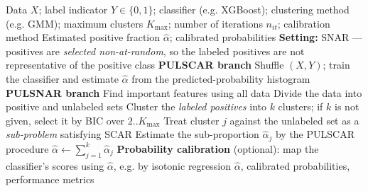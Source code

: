 \documentclass{article}
\begin{document}
\begin{algorithm}[!h]
\renewcommand{\algorithmicrequire}{\textbf{Input:}} %
\renewcommand{\algorithmicensure}{\textbf{Output:}} %
	\caption{PULSNAR (class-proportion estimation under SNAR)} %
	\begin{algorithmic}[1] %
	    \REQUIRE
	    Data $X$; label indicator $Y\in\{0,1\}$; classifier (e.g. XGBoost);
	    clustering method (e.g. GMM); maximum clusters $K_{\max}$;
	    number of iterations $n_{it}$; calibration method
	    \ENSURE
	    Estimated positive fraction $\hat{\alpha}$; calibrated probabilities
	    \STATE \textbf{Setting:} SNAR --- positives are \emph{selected non-at-random}, so the
	    labeled positives are not representative of the positive class %
	    \STATE \textbf{PULSCAR branch}
	    \STATE Shuffle $(X,Y)$; train the classifier and estimate $\hat{\alpha}$ from the
	    predicted-probability histogram %
	    \ENDFOR
	    \ELSE
	    \STATE \textbf{PULSNAR branch}
	    \STATE Find important features using all data %
	    \STATE Divide the data into positive and unlabeled sets
	    \STATE Cluster the \emph{labeled positives} into $k$ clusters;
	    if $k$ is not given, select it by BIC over $2..K_{\max}$ %
	    \STATE Treat cluster $j$ against the unlabeled set as a \emph{sub-problem} satisfying SCAR
	    \STATE Estimate the sub-proportion $\hat{\alpha}_{j}$ by the PULSCAR procedure %
	    \ENDFOR
	    \STATE $\hat{\alpha}\leftarrow \sum_{j=1}^{k}\hat{\alpha}_{j}$ %
	    \ENDIF
	    \STATE \textbf{Probability calibration} (optional): map the classifier's scores using
	    $\hat{\alpha}$, e.g. by isotonic regression %
		\RETURN $\hat{\alpha}$, calibrated probabilities, performance metrics
	\end{algorithmic}
\end{algorithm}
\end{document}
